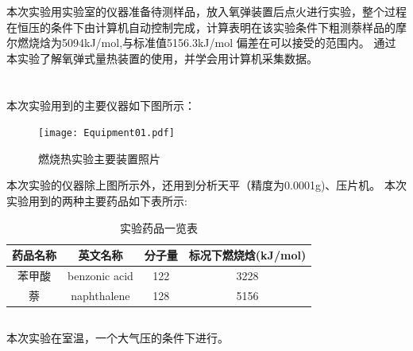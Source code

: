 ﻿\documentclass[10.5pt]{article}
\begin{document}
\title{\textbf{}} %
\author{}
\date{}
\maketitle
\section{\textbf{}}
本次实验用实验室的仪器准备待测样品，放入氧弹装置后点火进行实验，整个过程在恒压的条件下由计算机自动控制完成，计算表明在该实验条件下粗测萘样品的摩尔燃烧焓为5094kJ/mol,与标准值5156.3kJ/mol 偏差在可以接受的范围内。
通过本实验了解氧弹式量热装置的使用，并学会用计算机采集数据。
\section{\textbf{}}
\subsection{\textbf{}}
本次实验用到的主要仪器如下图所示：
\begin{figure}[!ht]
\centering
\caption{燃烧热实验主要装置照片}
\texttt{[image: Equipment01.pdf]}
\end{figure}


本次实验的仪器除上图所示外，还用到分析天平（精度为0.0001g)、压片机。
本次实验用到的两种主要药品如下表所示:
\newpage
\begin{table}[!ht]
\centering
\caption{实验药品一览表}
\begin{tabular}{cccc}
\hline
药品名称 & 英文名称 & 分子量 & 标况下燃烧焓(kJ/mol)\\
\hline
苯甲酸 & benzonic acid & 122 & 3228\\
萘 & naphthalene & 128 & 5156 \\
\hline
\end{tabular}
\end{table}


\subsection{\textbf{}}
本次实验在室温，一个大气压的条件下进行。
\end{document}
